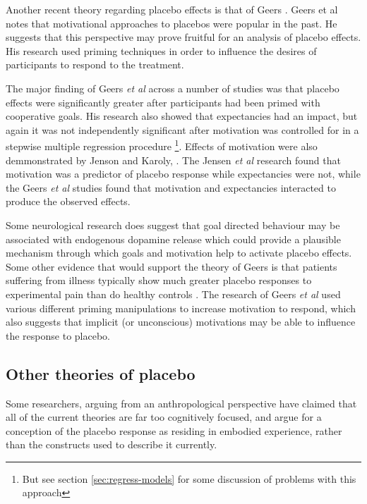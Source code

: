 Another recent theory regarding placebo effects is that of Geers \cite{Geers2005a}. Geers et al notes that  motivational approaches to placebos were popular in the past.  He suggests that this perspective may prove fruitful for an analysis of placebo effects.   His research used priming techniques in order to influence the desires of  participants to respond to the treatment. 

The major finding of Geers \textit{et al} across a number of studies \cite{Geers2007,Geers2005a} was that placebo effects were significantly greater after participants had been primed with cooperative goals. His research also showed that expectancies had an impact, but again it was not independently significant after motivation was controlled for in a stepwise multiple regression procedure \footnote{But see section \ref{sec:regress-models} for some discussion of problems with this approach}. Effects of motivation were also demmonstrated by Jenson and Karoly, \cite{Jensen1991}. The Jensen \textit{et al }   research found that motivation was a predictor of placebo response while expectancies were not, while the Geers \textit{et al } studies found that motivation and expectancies interacted to produce the observed effects.

Some neurological research does suggest that goal directed behaviour may be associated with endogenous dopamine release \cite{Scott2007a} which could provide a plausible mechanism through which  goals and motivation help to activate placebo effects. Some other evidence that would support the theory of Geers is that patients suffering from illness typically show much greater placebo responses to experimental pain than do healthy controls \cite{Klinger2007a}. The research of Geers \textit{et al } used various different priming manipulations to increase motivation to respond, which also suggests that implicit (or unconscious) motivations may be able to influence the response to placebo. 

\subsection{Other theories of placebo}
\label{sec:other-theor-plac}

Some researchers, arguing from an anthropological perspective \cite{Thompson2009}  have claimed that all of the current theories are far too cognitively focused, and argue for a conception of the placebo response as residing in embodied experience, rather than the constructs used to describe it currently. 

